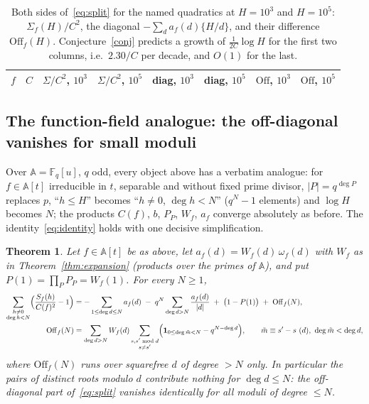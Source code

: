 \documentclass[11pt,a4paper]{article}
\newtheorem{theorem}{Theorem}
\theoremstyle{remark}\newtheorem{remark}[theorem]{Remark}
\newcommand{\F}{\mathbb{F}}
\newcommand{\A}{\mathbb{A}}
\begin{document}
\begin{table}[htbp]
\centering\small
\caption{Both sides of~\eqref{eq:split} for the named quadratics at $H=10^3$ and $H=10^5$:
$\Sigma_f(H)/C^2$, the diagonal $-\sum_da_f(d)\{H/d\}$, and their difference $\mathrm{Off}_f(H)$.
Conjecture~\ref{conj} predicts a growth of $\frac1{2C}\log H$ for the first two columns, i.e.\
$2.30/C$ per decade, and $O(1)$ for the last.}\label{tab:off}
\begin{tabular}{lrrrrrrr}
\toprule
$f$ & $C$ & $\Sigma/C^2$, $10^3$ & $\Sigma/C^2$, $10^5$ & diag, $10^3$ & diag, $10^5$ & $\mathrm{Off}$, $10^3$ & $\mathrm{Off}$, $10^5$\\
\midrule

\end{tabular}
\end{table}

\subsection{The function-field analogue: the off-diagonal vanishes for small moduli}\label{sec:ff}

Over $\A=\F_q[u]$, $q$ odd, every object above has a verbatim analogue: for $f\in\A[t]$ irreducible in
$t$, separable and without fixed prime divisor, $|P|=q^{\deg P}$ replaces $p$, ``$h\le H$'' becomes
``$h\ne0$, $\deg h<N$'' ($q^N-1$ elements) and $\log H$ becomes $N$; the products $C(f)$, $b$, $P_P$,
$W_f$, $a_f$ converge absolutely as before. The identity~\eqref{eq:identity} holds with one decisive
simplification.

\begin{theorem}\label{thm:ff}
Let $f\in\A[t]$ be as above, let $a_f(d)=W_f(d)\,\omega_f(d)$ with $W_f$ as in Theorem~\ref{thm:expansion}
(products over the primes of $\A$), and put $P(1)=\prod_PP_P=W_f(1)$. For every $N\ge1$,
\begin{align*}
\sum_{\substack{h\ne0\\\deg h<N}}\Bigl(\frac{S_f(h)}{C(f)^2}-1\Bigr)
&=-\sum_{1\le\deg d\le N}a_f(d)\;-\;q^N\sum_{\deg d>N}\frac{a_f(d)}{|d|}\;+\;\bigl(1-P(1)\bigr)\;+\;\mathrm{Off}_f(N),\\
\mathrm{Off}_f(N)&=\sum_{\deg d>N}W_f(d)\sum_{\substack{s,s'\bmod d\\ s\ne s'}}\Bigl(\mathbf 1_{0\le\deg\tilde m<N}-q^{N-\deg d}\Bigr),
\qquad \tilde m\equiv s'-s\ (d),\ \deg\tilde m<\deg d,
\end{align*}
where $\mathrm{Off}_f(N)$
runs over squarefree $d$ of degree $>N$ only. In particular the pairs of \emph{distinct} roots modulo $d$
contribute nothing for $\deg d\le N$: the off-diagonal part of~\eqref{eq:split} vanishes identically for
all moduli of degree $\le N$.
\end{theorem}
\end{document}
